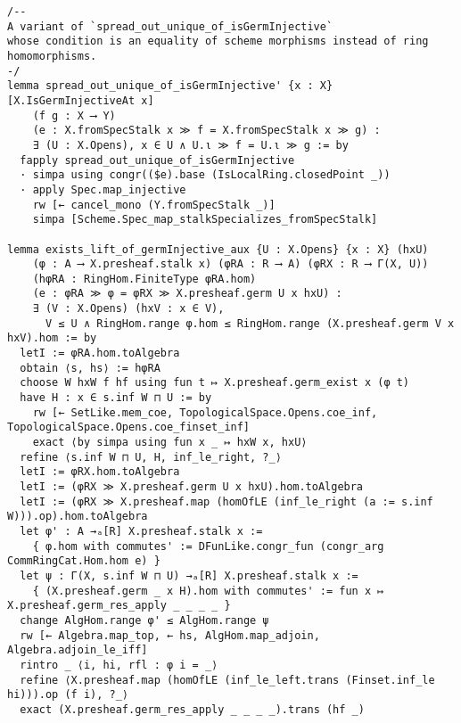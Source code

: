 \documentclass{article}
\begin{document}
\begin{lstlisting}[language=Lean, caption={SpreadingOut.lean}]
/--
A variant of `spread_out_unique_of_isGermInjective`
whose condition is an equality of scheme morphisms instead of ring homomorphisms.
-/
lemma spread_out_unique_of_isGermInjective' {x : X} [X.IsGermInjectiveAt x]
    (f g : X ⟶ Y)
    (e : X.fromSpecStalk x ≫ f = X.fromSpecStalk x ≫ g) :
    ∃ (U : X.Opens), x ∈ U ∧ U.ι ≫ f = U.ι ≫ g := by
  fapply spread_out_unique_of_isGermInjective
  · simpa using congr(($e).base (IsLocalRing.closedPoint _))
  · apply Spec.map_injective
    rw [← cancel_mono (Y.fromSpecStalk _)]
    simpa [Scheme.Spec_map_stalkSpecializes_fromSpecStalk]

lemma exists_lift_of_germInjective_aux {U : X.Opens} {x : X} (hxU)
    (φ : A ⟶ X.presheaf.stalk x) (φRA : R ⟶ A) (φRX : R ⟶ Γ(X, U))
    (hφRA : RingHom.FiniteType φRA.hom)
    (e : φRA ≫ φ = φRX ≫ X.presheaf.germ U x hxU) :
    ∃ (V : X.Opens) (hxV : x ∈ V),
      V ≤ U ∧ RingHom.range φ.hom ≤ RingHom.range (X.presheaf.germ V x hxV).hom := by
  letI := φRA.hom.toAlgebra
  obtain ⟨s, hs⟩ := hφRA
  choose W hxW f hf using fun t ↦ X.presheaf.germ_exist x (φ t)
  have H : x ∈ s.inf W ⊓ U := by
    rw [← SetLike.mem_coe, TopologicalSpace.Opens.coe_inf, TopologicalSpace.Opens.coe_finset_inf]
    exact ⟨by simpa using fun x _ ↦ hxW x, hxU⟩
  refine ⟨s.inf W ⊓ U, H, inf_le_right, ?_⟩
  letI := φRX.hom.toAlgebra
  letI := (φRX ≫ X.presheaf.germ U x hxU).hom.toAlgebra
  letI := (φRX ≫ X.presheaf.map (homOfLE (inf_le_right (a := s.inf W))).op).hom.toAlgebra
  let φ' : A →ₐ[R] X.presheaf.stalk x :=
    { φ.hom with commutes' := DFunLike.congr_fun (congr_arg CommRingCat.Hom.hom e) }
  let ψ : Γ(X, s.inf W ⊓ U) →ₐ[R] X.presheaf.stalk x :=
    { (X.presheaf.germ _ x H).hom with commutes' := fun x ↦ X.presheaf.germ_res_apply _ _ _ _ }
  change AlgHom.range φ' ≤ AlgHom.range ψ
  rw [← Algebra.map_top, ← hs, AlgHom.map_adjoin, Algebra.adjoin_le_iff]
  rintro _ ⟨i, hi, rfl : φ i = _⟩
  refine ⟨X.presheaf.map (homOfLE (inf_le_left.trans (Finset.inf_le hi))).op (f i), ?_⟩
  exact (X.presheaf.germ_res_apply _ _ _ _).trans (hf _)


\end{lstlisting}
\end{document}
